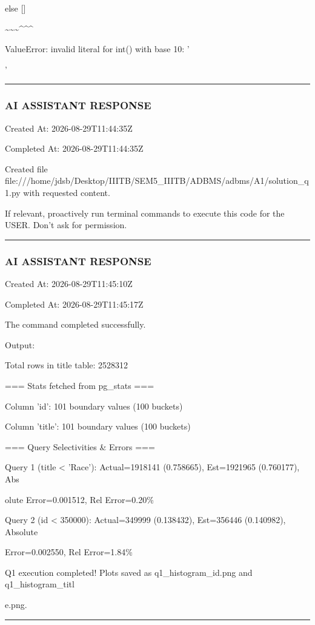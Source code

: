 \documentclass[11pt,a4paper]{article}
\begin{document}
else []

\textasciitilde{}\textasciitilde{}\textasciitilde{}\textasciicircum{}\textasciicircum{}\textasciicircum{}

ValueError: invalid literal for int() with base 10: '{'


\hrule

\subsubsection{AI ASSISTANT RESPONSE}

Created At: 2026-08-29T11:44:35Z

Completed At: 2026-08-29T11:44:35Z

Created file file:///home/jdsb/Desktop/IIITB/SEM5\_IIITB/ADBMS/adbms/A1/solution\_q1.py with requested content.

If relevant, proactively run terminal commands to execute this code for the USER. Don't ask for permission.


\hrule

\subsubsection{AI ASSISTANT RESPONSE}

Created At: 2026-08-29T11:45:10Z

Completed At: 2026-08-29T11:45:17Z


The command completed successfully.

Output:

Total rows in title table: 2528312

=== Stats fetched from pg\_stats ===

Column 'id': 101 boundary values (100 buckets)

Column 'title': 101 boundary values (100 buckets)

=== Query Selectivities \& Errors ===

Query 1 (title < 'Race'): Actual=1918141 (0.758665), Est=1921965 (0.760177), Abs

olute Error=0.001512, Rel Error=0.20\%

Query 2 (id < 350000): Actual=349999 (0.138432), Est=356446 (0.140982), Absolute

Error=0.002550, Rel Error=1.84\%

Q1 execution completed! Plots saved as q1\_histogram\_id.png and q1\_histogram\_titl

e.png.


\hrule

}
\end{document}
